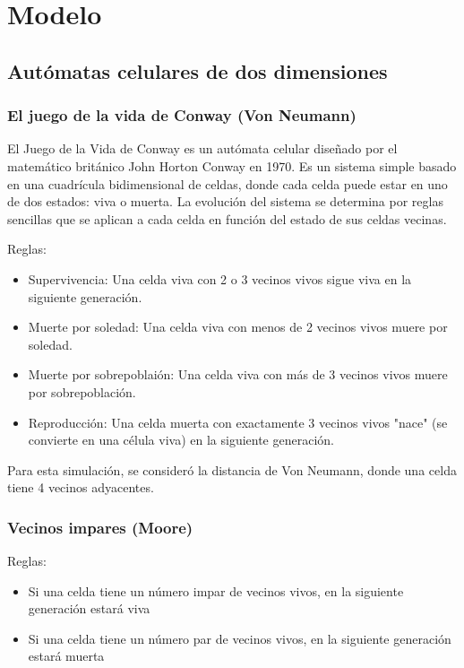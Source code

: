 \section{Modelo}
\label{sec:modelo}

\subsection{Autómatas celulares de dos dimensiones}
\label{subsec:2d}

\subsubsection{El juego de la vida de Conway (Von Neumann)}

El Juego de la Vida de Conway es un autómata celular diseñado por el matemático británico John Horton Conway en 1970.
Es un sistema simple basado en una cuadrícula bidimensional de celdas, donde cada celda puede estar en uno de dos estados: viva o muerta.
La evolución del sistema se determina por reglas sencillas que se aplican a cada celda en función del estado de sus celdas vecinas.

Reglas:
\begin{itemize}
    \item Supervivencia: Una celda viva con 2 o 3 vecinos vivos sigue viva en la siguiente generación.

    \item Muerte por soledad: Una celda viva con menos de 2 vecinos vivos muere por soledad.

    \item Muerte por sobrepoblaión: Una celda viva con más de 3 vecinos vivos muere por sobrepoblación.

    \item Reproducción: Una celda muerta con exactamente 3 vecinos vivos "nace" (se convierte en una célula viva) en la siguiente generación.
\end{itemize}

Para esta simulación, se consideró la distancia de Von Neumann, donde una celda tiene 4 vecinos adyacentes.

\subsubsection{Vecinos impares (Moore)}

Reglas:
\begin{itemize}
    \item Si una celda tiene un número impar de vecinos vivos, en la siguiente generación estará viva
    \item Si una celda tiene un número par de vecinos vivos, en la siguiente generación estará muerta
\end{itemize}


